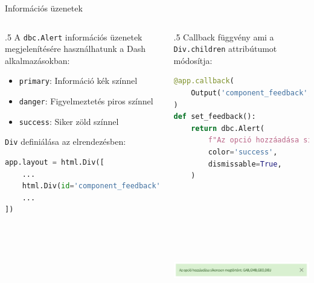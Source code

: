 \documentclass[english, aspectratio=169]{beamer}
\begin{document}
\begin{frame}[fragile]{Információs üzenetek}
	\begin{columns}
		\begin{column}{.5\textwidth}
			A \texttt{dbc.Alert} információs üzenetek megjelenítésére használhatunk a Dash alkalmazásokban:
			\begin{itemize}
				\item \texttt{primary}: Információ kék színnel
				\item \texttt{danger}: Figyelmeztetés piros színnel
				\item \texttt{success}: Siker zöld színnel
			\end{itemize}
			\par\medskip
			\texttt{Div} definiálása az elrendezésben:
			\begin{lstlisting}[language=python]
app.layout = html.Div([
	...
	html.Div(id='component_feedback'),
	...
])
			\end{lstlisting}
		\end{column}
		\begin{column}{.5\textwidth}
			Callback függvény ami a \texttt{Div.children} attribútumot módosítja: 
			\begin{lstlisting}[language=python]
@app.callback(
	Output('component_feedback', 'children')
)
def set_feedback():
	return dbc.Alert(
		f"Az opció hozzáadása sikeresen megtörtént: {','.join(text)}",
		color='success',
		dismissable=True,
	)
			\end{lstlisting}
			\par\smallskip
			\begin{center}
				\includegraphics[width=7cm, height=7cm, keepaspectratio]{images/freq_25.png}
			\end{center}
		\end{column}
	\end{columns}
\end{frame}
\end{document}

